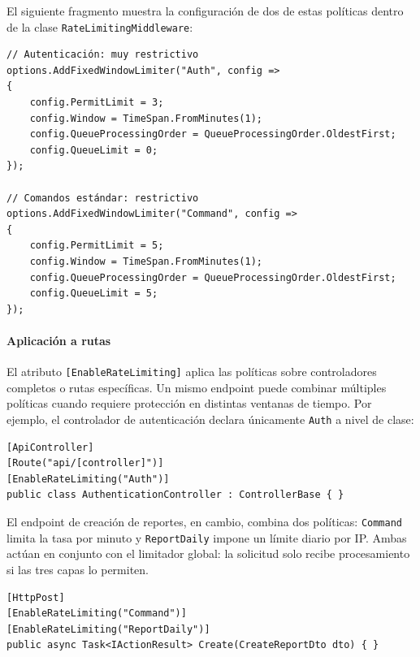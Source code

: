 El siguiente fragmento muestra la configuración de dos de estas políticas dentro de la clase \texttt{RateLimitingMiddleware}:

\begin{lstlisting}[language={[Sharp]C}, caption={Configuración de políticas de rate limiting}, label={lst:ratelimiting}]
// Autenticación: muy restrictivo
options.AddFixedWindowLimiter("Auth", config =>
{
    config.PermitLimit = 3;
    config.Window = TimeSpan.FromMinutes(1);
    config.QueueProcessingOrder = QueueProcessingOrder.OldestFirst;
    config.QueueLimit = 0;
});

// Comandos estándar: restrictivo
options.AddFixedWindowLimiter("Command", config =>
{
    config.PermitLimit = 5;
    config.Window = TimeSpan.FromMinutes(1);
    config.QueueProcessingOrder = QueueProcessingOrder.OldestFirst;
    config.QueueLimit = 5;
});
\end{lstlisting}




\paragraph{Aplicación a rutas}
El atributo \texttt{[EnableRate\-Limiting]} aplica las políticas sobre controladores completos o rutas específicas. Un mismo endpoint puede combinar múltiples políticas cuando requiere protección en distintas ventanas de tiempo. Por ejemplo, el controlador de autenticación declara únicamente \texttt{Auth} a nivel de clase:

\begin{lstlisting}[language={[Sharp]C}, caption={Aplicación del rate limiting a controladores y rutas}, label={lst:ratelimitingapplication}]
[ApiController]
[Route("api/[controller]")]
[EnableRateLimiting("Auth")]
public class AuthenticationController : ControllerBase { }
\end{lstlisting}

El endpoint de creación de reportes, en cambio, combina dos políticas: \texttt{Command} limita la tasa por minuto y \texttt{ReportDaily} impone un límite diario por IP. 
Ambas actúan en conjunto con el limitador global: la solicitud solo recibe procesamiento si las tres capas lo permiten.

\begin{lstlisting}[language={[Sharp]C}, caption={Combinación de políticas en un mismo endpoint}, label={lst:ratelimitingcombination}]
[HttpPost]
[EnableRateLimiting("Command")]
[EnableRateLimiting("ReportDaily")]
public async Task<IActionResult> Create(CreateReportDto dto) { }
\end{lstlisting}



